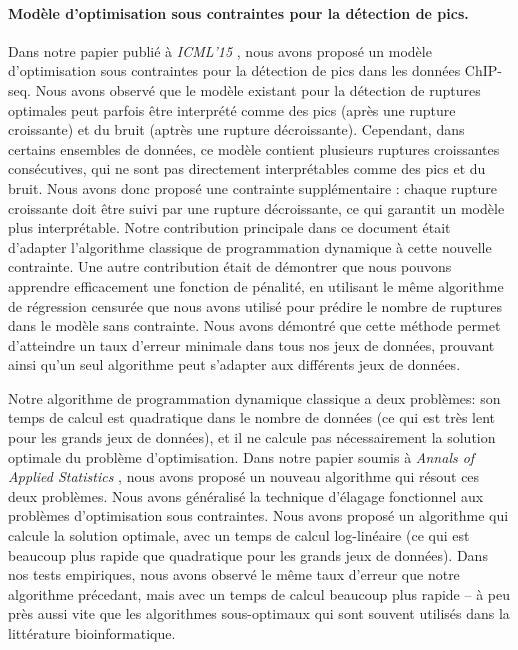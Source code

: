 \documentclass{article}
\begin{document}
\paragraph{Modèle d'optimisation sous contraintes pour la détection de
  pics.} Dans notre papier publié à \emph{ICML'15}
\citep{HOCKING-PeakSeg}, nous avons proposé un modèle d'optimisation
sous contraintes pour la détection de pics dans les données
ChIP-seq. Nous avons observé que le modèle existant pour la détection
de ruptures optimales peut parfois être interprété comme des pics
(après une rupture croissante) et du bruit (aptrès une rupture
décroissante). Cependant, dans certains ensembles de données, ce
modèle contient plusieurs ruptures croissantes consécutives, qui ne
sont pas directement interprétables comme des pics et du bruit. Nous
avons donc proposé une contrainte supplémentaire : chaque rupture
croissante doit être suivi par une rupture décroissante, ce qui
garantit un modèle plus interprétable. Notre contribution principale
dans ce document était d'adapter l'algorithme classique de
programmation dynamique à cette nouvelle contrainte. Une autre
contribution était de démontrer que nous pouvons apprendre
efficacement une fonction de pénalité, en utilisant le même algorithme
de régression censurée que nous avons utilisé pour prédire le nombre
de ruptures dans le modèle sans contrainte. Nous avons démontré que
cette méthode permet d'atteindre un taux d'erreur minimale dans tous
nos jeux de données, prouvant ainsi qu'un seul algorithme peut
s'adapter aux différents jeux de données.

Notre algorithme de programmation dynamique classique a deux
problèmes: son temps de calcul est quadratique dans le nombre de
données (ce qui est très lent pour les grands jeux de données), et il
ne calcule pas nécessairement la solution optimale du problème
d'optimisation. Dans notre papier soumis à \emph{Annals of Applied
  Statistics} \citep{Hocking-constrained-changepoint-detection}, nous
avons proposé un nouveau algorithme qui résout ces deux
problèmes. Nous avons généralisé la technique d'élagage fonctionnel
aux problèmes d'optimisation sous contraintes.  Nous avons proposé un
algorithme qui calcule la solution optimale, avec un temps de calcul
log-linéaire (ce qui est beaucoup plus rapide que quadratique pour les
grands jeux de données). Dans nos tests empiriques, nous avons observé
le même taux d'erreur que notre algorithme précedant, mais avec un
temps de calcul beaucoup plus rapide -- à peu près aussi vite que les
algorithmes sous-optimaux qui sont souvent utilisés dans la littérature
bioinformatique.
  
\end{document}
